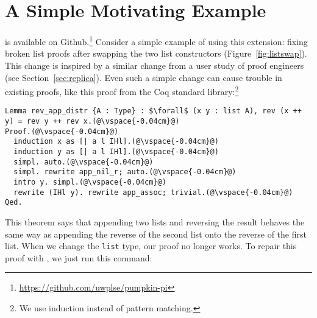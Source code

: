 \section{A Simple Motivating Example}
\label{sec:overview}

\begin{figure*}
\begin{minipage}{0.46\textwidth}
   
\end{minipage}
\hfill
\begin{minipage}{0.46\textwidth}
   
\end{minipage}
\vspace{-0.3cm}
\caption{The updated \lstinline{list} (right) is the old \lstinline{list} (left) with its two constructors swapped ().}
\label{fig:listswap}
\end{figure*}

\toolname is available on Github.\footnote{\url{https://github.com/uwplse/pumpkin-pi}}
Consider a simple example of using this extension: fixing broken list proofs after swapping the two list constructors (Figure~\ref{fig:listswap}).
This change is inspired by a similar change from a user study of proof engineers (see Section~\ref{sec:replica}).
Even such a simple change can cause trouble in existing proofs, like this proof from the Coq standard library:\footnote{We use induction instead of pattern matching.}

\begin{lstlisting}
Lemma rev_app_distr {A : Type} : $\forall$ (x y : list A), rev (x ++ y) = rev y ++ rev x.(@\vspace{-0.04cm}@)
Proof.(@\vspace{-0.04cm}@)
  induction x as [| a l IHl].(@\vspace{-0.04cm}@)
  induction y as [| a l IHl].(@\vspace{-0.04cm}@)
  simpl. auto.(@\vspace{-0.04cm}@)
  simpl. rewrite app_nil_r; auto.(@\vspace{-0.04cm}@)
  intro y. simpl.(@\vspace{-0.04cm}@)
  rewrite (IHl y). rewrite app_assoc; trivial.(@\vspace{-0.04cm}@)
Qed.
\end{lstlisting}
This theorem says that appending two lists and reversing the result behaves the same way as appending
the reverse of the second list onto the reverse of the first list.
When we change the \lstinline{list} type, our proof no longer works.
To repair this proof with \toolname, we just run this command:

